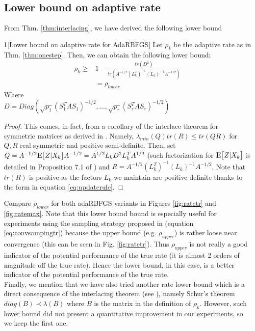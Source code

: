 \documentclass[12pt,conference,compsocconf]{IEEEtran}
\newcommand{\E}{{\rm I\kern-.3em E}}
\begin{document}
\subsection{Lower bound on adaptive rate}\label{sect:adaptive rate}
From Thm. \ref{thm:interlacing}, we have derived the following lower bound
\begin{customthm}{1}[Lower bound on adaptive rate for AdaRBFGS] \label{thm:lowerbada}
Let $\rho_k$ be the adaptive rate as in Thm. \ref{thm:onestep}. Then, we can obtain the following lower bound:
\begin{align}\label{eq:lowerbada}
\rho_k \geq &1-\frac{tr(D^2)}{tr(A^{-1/2}(L_k^T)^{-1} (L_k)^{-1}A^{-1/2})}\\ \nonumber
&=\rho_{lower} \nonumber
\end{align}
Where\\
$D=Diag(\sqrt{p_1}(S_1^TAS_1)^{-1/2},\ldots,\sqrt{p_r}(S_r^TAS_r)^{-1/2})$
\vspace{-5mm}
\begin{proof}
This comes, in fact, from a corollary of the interlace theorem for symmetric matrices as derived in \cite{J Tao,Fang}. Namely, $\lambda_{min}(Q)tr(R)\leq tr(QR)$ for $Q,R$ real symmetric and positive semi-definite. Then, set $Q=A^{-1/2}\E\big[Z|X_k\big]A^{-1/2}=A^{1/2}L_kD^{2}L_k^TA^{1/2}$ (such factorization for $\E\big[Z|X_k\big]$ is detailed in Proposition 7.1 of \cite{Gower1}) and $R=A^{-1/2}(L_k^T)^{-1} (L_k)^{-1}A^{-1/2}$. Note that $tr(R)$ is positive as the factors $L_k$ we maintain are positive definite thanks to the form in equation \eqref{eq:updaterule}.
\end{proof}
\end{customthm}
Compare $\rho_{lower}$ for both adaRBFGS variants in Figures \ref{fig:ratetr} and \ref{fig:ratemax}. Note that this lower bound bound is especially useful for experiments using the sampling strategy proposed in \cite{Gower1} (equation \eqref{eq:convsampingtr}) because the upper bound (e.g. $\rho_{upper}$) is rather loose near convergence (this can be seen in Fig. \ref{fig:ratetr}). Thus $\rho_{upper}$ is not really a good indicator of the potential performance of the true rate (it is almost $2$ orders of magnitude off the true rate). Hence the lower bound, in this case, is a better indicator of the potential performance of the true rate.\\
Finally, we mention that we have also tried another rate lower bound which is a direct consequence of the interlacing theorem (see \cite{J Tao}), namely Schur's theorem $diag(B) \prec \lambda(B)$ where $B$ is the matrix in the definition of $\rho_k$. However, such lower bound did not present a quantitative improvement in our experiments, so we keep the first one.
\end{document}
